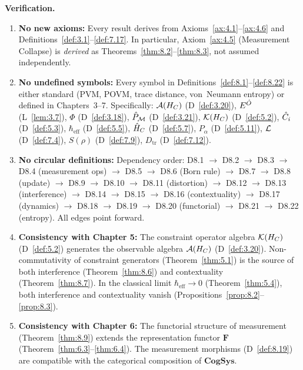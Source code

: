 \noindent\textbf{Verification.}
\begin{enumerate}
  \item \textbf{No new axioms:}
    Every result derives from Axioms~\ref{ax:4.1}--\ref{ax:4.6} and
    Definitions~\ref{def:3.1}--\ref{def:7.17}.
    In particular, Axiom~\ref{ax:4.5} (Measurement Collapse) is
    \emph{derived} as Theorems~\ref{thm:8.2}--\ref{thm:8.3}, not
    assumed independently.

  \item \textbf{No undefined symbols:}
    Every symbol in Definitions~\ref{def:8.1}--\ref{def:8.22} is
    either standard (PVM, POVM, trace distance, von~Neumann entropy)
    or defined in Chapters~3--7.  Specifically:
    $\mathcal{A}(H_C)$ (D~\ref{def:3.20}),
    $E^{\hat{O}}$ (L~\ref{lem:3.7}),
    $\Phi$ (D~\ref{def:3.18}),
    $\hat{P}_{\mathcal{M}}$ (D~\ref{def:3.21}),
    $\mathcal{K}(H_C)$ (D~\ref{def:5.2}),
    $\hat{C}_i$ (D~\ref{def:5.3}),
    $\hbar_{\mathrm{eff}}$ (D~\ref{def:5.5}),
    $\hat{H}_C$ (D~\ref{def:5.7}),
    $P_\alpha$ (D~\ref{def:5.11}),
    $\mathcal{L}$ (D~\ref{def:7.4}),
    $S(\rho)$ (D~\ref{def:7.9}),
    $D_{\mathrm{tr}}$ (D~\ref{def:7.12}).

  \item \textbf{No circular definitions:}
    Dependency order: D8.1 $\to$ D8.2 $\to$ D8.3 $\to$ D8.4
    (measurement ops) $\to$ D8.5 $\to$ D8.6 (Born rule) $\to$
    D8.7 $\to$ D8.8 (update) $\to$ D8.9 $\to$ D8.10 $\to$ D8.11
    (distortion) $\to$ D8.12 $\to$ D8.13 (interference) $\to$
    D8.14 $\to$ D8.15 $\to$ D8.16 (contextuality) $\to$
    D8.17 (dynamics) $\to$ D8.18 $\to$ D8.19 $\to$ D8.20
    (functorial) $\to$ D8.21 $\to$ D8.22 (entropy).
    All edges point forward.

  \item \textbf{Consistency with Chapter 5:}
    The constraint operator algebra $\mathcal{K}(H_C)$ (D~\ref{def:5.2})
    generates the observable algebra $\mathcal{A}(H_C)$ (D~\ref{def:3.20}).
    Non-commutativity of constraint generators
    (Theorem~\ref{thm:5.1}) is the source of both interference
    (Theorem~\ref{thm:8.6}) and contextuality
    (Theorem~\ref{thm:8.7}).  In the classical limit
    $\hbar_{\mathrm{eff}} \to 0$ (Theorem~\ref{thm:5.4}), both
    interference and contextuality vanish
    (Propositions~\ref{prop:8.2}--\ref{prop:8.3}).

  \item \textbf{Consistency with Chapter 6:}
    The functorial structure of measurement
    (Theorem~\ref{thm:8.9}) extends the representation functor
    $\mathbf{F}$ (Theorem~\ref{thm:6.3}--\ref{thm:6.4}).  The
    measurement morphisms (D~\ref{def:8.19}) are compatible with the
    categorical composition of $\mathbf{CogSys}$.


\end{enumerate}
